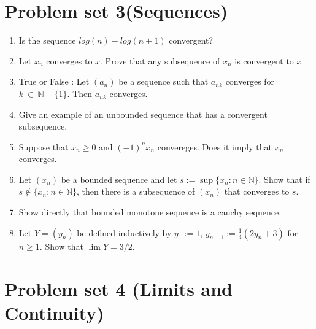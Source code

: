 \documentclass[12pt]{article}
\begin{document}
\newpage

\section{Problem set 3(Sequences)}
    \begin{enumerate}
        \item Is the sequence $ log (n) - log(n+1) $ convergent?
        \item Let $x_n $ converges to $x$. Prove that any subsequence of $x_n $ is convergent to $x$.
        \item True or False :
        Let $(a_n)$ be a sequence such that $a_{nk}$ converges for $k~\in~ \mathbb N - \{1\}$. Then $a_{nk}$ converges. 
        \item Give an example of an unbounded sequence that has a convergent subsequence.
        \item Suppose that $x_n\geq0$ and $(-1)^nx_n$ convereges. Does it imply that $x_n$ converges.
        \item Let $(x_n)$ be a bounded sequence and let $s := \sup\{x_n : n \in \mathbb{N}\}$. Show that if $s \notin \{x_n : n \in \mathbb{N}\}$, then there is a subsequence of $(x_n)$ that converges to $s$.
        \item Show directly that bounded monotone sequence is a cauchy sequence.
        \item Let $Y = (y_n)$ be defined inductively by $y_1 := 1$, $y_{n+1} := \frac{1}{4}(2y_n+3)$ for $n \ge 1$. Show that $\lim Y = 3/2$.
    \end{enumerate}

\newpage

\section{Problem set 4 (Limits and Continuity)}
\end{document}
